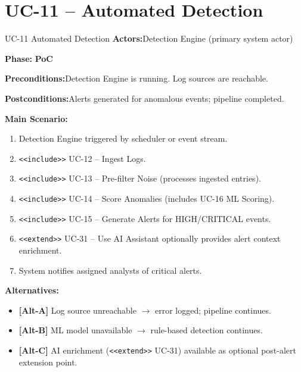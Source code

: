 \documentclass[12pt,a4paper]{report}
\newcommand{\ucfield}[2]{%
    \noindent\textbf{\color{helixpurplemid}#1:}\quad #2\par\medskip
}
\newcommand{\ucphase}[1]{%
    \noindent\textbf{\color{helixpurplemid}Phase:}\quad%
    \ifstrequal{#1}{PoC}{\textcolor{helixteal}{\textbf{PoC}}}{\textcolor{helixamber}{\textbf{Future MVP}}}%
    \par\medskip
}
\begin{document}
\section{UC-11 -- Automated Detection}
\begin{ucbox}{UC-11 \quad Automated Detection}
    \ucfield{Actors}{Detection Engine (primary system actor)}
    \ucphase{PoC}
    \ucfield{Preconditions}{Detection Engine is running. Log sources are reachable.}
    \ucfield{Postconditions}{Alerts generated for anomalous events; pipeline completed.}
    \textbf{\color{helixpurplemid}Main Scenario:}
    \begin{enumerate}
        \item Detection Engine triggered by scheduler or event stream.
        \item \texttt{<<include>>} UC-12 -- Ingest Logs.
        \item \texttt{<<include>>} UC-13 -- Pre-filter Noise (processes ingested entries).
        \item \texttt{<<include>>} UC-14 -- Score Anomalies (includes UC-16 ML Scoring).
        \item \texttt{<<include>>} UC-15 -- Generate Alerts for HIGH/CRITICAL events.
        \item \texttt{<<extend>>} UC-31 -- Use AI Assistant optionally provides alert context enrichment.
        \item System notifies assigned analysts of critical alerts.
    \end{enumerate}
    \textbf{\color{helixpurplemid}Alternatives:}
    \begin{itemize}
        \item \textbf{[Alt-A]} Log source unreachable $\rightarrow$ error logged; pipeline continues.
        \item \textbf{[Alt-B]} ML model unavailable $\rightarrow$ rule-based detection continues.
        \item \textbf{[Alt-C]} AI enrichment (\texttt{<<extend>>} UC-31) available as optional post-alert extension point.
    \end{itemize}
\end{ucbox}
\end{document}
